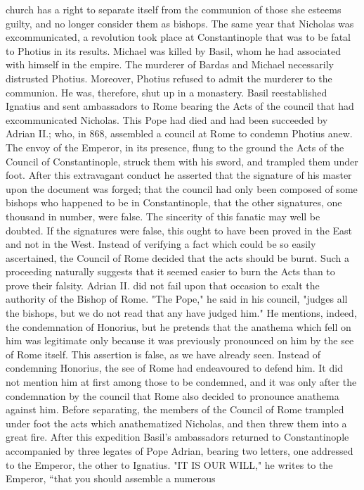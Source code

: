 church has a right to separate itself from the communion of those she esteems guilty, and no longer consider them as bishops. The same year that Nicholas was excommunicated, a revolution took place at Constantinople that was to be fatal to Photius in its results. Michael was killed by Basil, whom he had associated with himself in the empire. The murderer of Bardas and Michael necessarily distrusted Photius. Moreover, Photius refused to admit the murderer to the communion. He was, therefore, shut up in a monastery. Basil reestablished Ignatius and sent ambassadors to Rome bearing the Acts of the council that had excommunicated Nicholas. This Pope had died and had been succeeded by Adrian II.; who, in 868, assembled a council at Rome to condemn Photius anew. The envoy of the Emperor, in its presence, flung to the ground the Acts of the Council of Constantinople, struck them with his sword, and trampled them under foot. After this extravagant conduct he asserted that the signature of his master upon the document was forged; that the council had only been composed of some bishops who happened to be in Constantinople, that the other signatures, one thousand in number, were false. The sincerity of this fanatic may well be doubted. If the signatures were false, this ought to have been proved in the East and not in the West. Instead of verifying a fact which could be so easily ascertained, the Council of Rome decided that the acts should be burnt. Such a proceeding naturally suggests that it seemed easier to burn the Acts than to prove their falsity. Adrian II. did not fail upon that occasion to exalt the authority of the Bishop of Rome. "The Pope," he said in his council, "judges all the bishops, but we do not read that any have judged him." He mentions, indeed, the condemnation of Honorius, but he pretends that the anathema which fell on him was legitimate only because it was previously pronounced on him by the see of Rome itself. This assertion is false, as we have already seen. Instead of condemning Honorius, the see of Rome had endeavoured to defend him. It did not mention him at first among those to be condemned, and it was only after the condemnation by the council that Rome also decided to pronounce anathema against him. Before separating, the members of the Council of Rome trampled under foot the acts which anathematized Nicholas, and then threw them into a great fire. After this expedition Basil's ambassadors returned to Constantinople accompanied by three legates of Pope Adrian, bearing two letters, one addressed to the Emperor, the other to Ignatius. "IT IS OUR WILL," he writes to the Emperor, “that you should assemble a numerous

